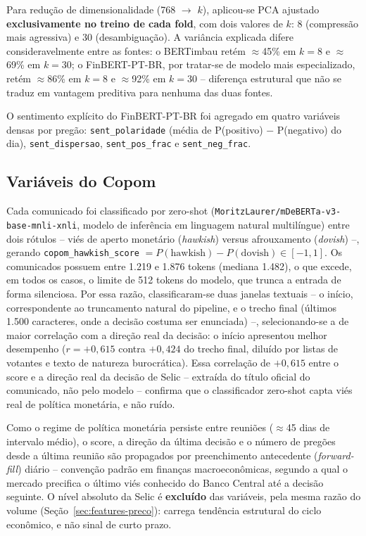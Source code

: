 \documentclass[conference]{IEEEtran}
\begin{document}
Para redu\c{c}\~ao de dimensionalidade (768 $\to$ $k$), aplicou-se PCA ajustado \textbf{exclusivamente no treino de cada fold}, com dois valores de $k$: 8 (compress\~ao mais agressiva) e 30 (desambigua\c{c}\~ao). A vari\^ancia explicada difere consideravelmente entre as fontes: o BERTimbau ret\'em $\approx$45\% em $k=8$ e $\approx$69\% em $k=30$; o FinBERT-PT-BR, por tratar-se de modelo mais especializado, ret\'em $\approx$86\% em $k=8$ e $\approx$92\% em $k=30$ -- diferen\c{c}a estrutural que n\~ao se traduz em vantagem preditiva para nenhuma das duas fontes.

O sentimento expl\'icito do FinBERT-PT-BR foi agregado em quatro vari\'aveis densas por preg\~ao: \texttt{sent\_polaridade} (m\'edia de P(positivo) $-$ P(negativo) do dia), \texttt{sent\_dispersao}, \texttt{sent\_pos\_frac} e \texttt{sent\_neg\_frac}.

\subsection{Vari\'aveis do Copom}

Cada comunicado foi classificado por zero-shot (\texttt{MoritzLaurer/mDeBERTa-v3-base-mnli-xnli}, modelo de infer\^encia em linguagem natural multil\'ingue) entre dois r\'otulos -- vi\'es de aperto monet\'ario (\emph{hawkish}) versus afrouxamento (\emph{dovish}) --, gerando \texttt{copom\_hawkish\_score} $=P(\text{hawkish})-P(\text{dovish})\in[-1,1]$. Os comunicados possuem entre 1.219 e 1.876 tokens (mediana 1.482), o que excede, em todos os casos, o limite de 512 tokens do modelo, que trunca a entrada de forma silenciosa. Por essa raz\~ao, classificaram-se duas janelas textuais -- o in\'icio, correspondente ao truncamento natural do pipeline, e o trecho final (\'ultimos 1.500 caracteres, onde a decis\~ao costuma ser enunciada) --, selecionando-se a de maior correla\c{c}\~ao com a dire\c{c}\~ao real da decis\~ao: o in\'icio apresentou melhor desempenho ($r=+0{,}615$ contra $+0{,}424$ do trecho final, dilu\'ido por listas de votantes e texto de natureza burocr\'atica). Essa correla\c{c}\~ao de $+0{,}615$ entre o score e a dire\c{c}\~ao real da decis\~ao de Selic -- extra\'ida do t\'itulo oficial do comunicado, n\~ao pelo modelo -- confirma que o classificador zero-shot capta vi\'es real de pol\'itica monet\'aria, e n\~ao ru\'ido.

Como o regime de pol\'itica monet\'aria persiste entre reuni\~oes ($\approx$45 dias de intervalo m\'edio), o score, a dire\c{c}\~ao da \'ultima decis\~ao e o n\'umero de preg\~oes desde a \'ultima reuni\~ao s\~ao propagados por preenchimento antecedente (\emph{forward-fill}) di\'ario -- conven\c{c}\~ao padr\~ao em finan\c{c}as macroecon\^omicas, segundo a qual o mercado precifica o \'ultimo vi\'es conhecido do Banco Central at\'e a decis\~ao seguinte. O n\'ivel absoluto da Selic \'e \textbf{exclu\'ido} das vari\'aveis, pela mesma raz\~ao do volume (Se\c{c}\~ao~\ref{sec:features-preco}): carrega tend\^encia estrutural do ciclo econ\^omico, e n\~ao sinal de curto prazo.
\end{document}

